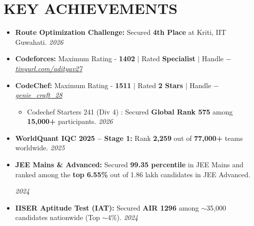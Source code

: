 \documentclass[letterpaper,11pt]{article}
\begin{document}
\section{KEY ACHIEVEMENTS}
 \begin{itemize}[leftmargin=0.15in, label={$\vcenter{\hbox{\tiny$\bullet$}}$}]
    \small
    \item \textbf{Route Optimization Challenge:} Secured \textbf{4th Place} at Kriti, IIT Guwahati. \hfill \textit{2026}
    \vspace{-2pt}
    
    \item \textbf{Codeforces:} Maximum Rating - \textbf{1402} $|$ Rated \textbf{Specialist} $|$ Handle $-$ \href{https://codeforces.com/profile/kal_se_CP_chalu}{\textit{tinyurl.com/adityav27}}
    \vspace{-2pt}
    
    \item \textbf{CodeChef:} Maximum Rating - \textbf{1511} $|$ Rated \textbf{2 Stars} $|$ Handle $-$ \href{https://www.codechef.com/users/genie_craft_28}{\textit{genie\_craft\_28}}
    \vspace{-2pt}
    \begin{itemize}[leftmargin=0.2in, label={--}]
        \item Codechef Starters 241 (Div 4) : Secured \textbf{Global Rank 575} among \textbf{15,000+} participants. \hfill \textit{2026}
    \end{itemize}
    \vspace{-2pt}

    \item \textbf{WorldQuant IQC 2025 -- Stage 1:} Rank \textbf{2,259} out of \textbf{77,000+} teams worldwide. \hfill \textit{2025}
    \vspace{-2pt}
    
    \item \parbox[t]{0.92\linewidth}{\textbf{JEE Mains \& Advanced:} Secured \textbf{99.35 percentile} in JEE Mains and ranked among the \textbf{top 6.55\%} out of 1.86 lakh candidates in JEE Advanced.}\hfill \textit{2024}
    \vspace{-2pt}
    
    \item \textbf{IISER Aptitude Test (IAT):} Secured \textbf{AIR 1296} among $\sim$35,000 candidates nationwide (Top $\sim$4\%). \hfill \textit{2024}
 \end{itemize}
\end{document}
